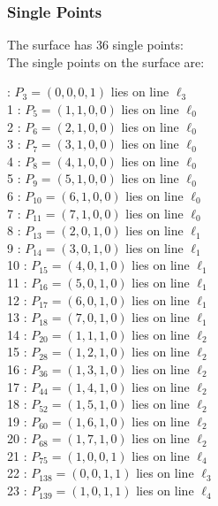 \documentclass{article}
\begin{document}
{\subsubsection*{Single Points}
The surface has 36 single points:\\
The single points on the surface are:\\
\begin{multicols}{2}
 : $P_{3}=( 0, 0, 0, 1 )$ lies on line $\ell_{3}$\\
1 : $P_{5}=( 1, 1, 0, 0 )$ lies on line $\ell_{0}$\\
2 : $P_{6}=( 2, 1, 0, 0 )$ lies on line $\ell_{0}$\\
3 : $P_{7}=( 3, 1, 0, 0 )$ lies on line $\ell_{0}$\\
4 : $P_{8}=( 4, 1, 0, 0 )$ lies on line $\ell_{0}$\\
5 : $P_{9}=( 5, 1, 0, 0 )$ lies on line $\ell_{0}$\\
6 : $P_{10}=( 6, 1, 0, 0 )$ lies on line $\ell_{0}$\\
7 : $P_{11}=( 7, 1, 0, 0 )$ lies on line $\ell_{0}$\\
8 : $P_{13}=( 2, 0, 1, 0 )$ lies on line $\ell_{1}$\\
9 : $P_{14}=( 3, 0, 1, 0 )$ lies on line $\ell_{1}$\\
10 : $P_{15}=( 4, 0, 1, 0 )$ lies on line $\ell_{1}$\\
11 : $P_{16}=( 5, 0, 1, 0 )$ lies on line $\ell_{1}$\\
12 : $P_{17}=( 6, 0, 1, 0 )$ lies on line $\ell_{1}$\\
13 : $P_{18}=( 7, 0, 1, 0 )$ lies on line $\ell_{1}$\\
14 : $P_{20}=( 1, 1, 1, 0 )$ lies on line $\ell_{2}$\\
15 : $P_{28}=( 1, 2, 1, 0 )$ lies on line $\ell_{2}$\\
16 : $P_{36}=( 1, 3, 1, 0 )$ lies on line $\ell_{2}$\\
17 : $P_{44}=( 1, 4, 1, 0 )$ lies on line $\ell_{2}$\\
18 : $P_{52}=( 1, 5, 1, 0 )$ lies on line $\ell_{2}$\\
19 : $P_{60}=( 1, 6, 1, 0 )$ lies on line $\ell_{2}$\\
20 : $P_{68}=( 1, 7, 1, 0 )$ lies on line $\ell_{2}$\\
21 : $P_{75}=( 1, 0, 0, 1 )$ lies on line $\ell_{4}$\\
22 : $P_{138}=( 0, 0, 1, 1 )$ lies on line $\ell_{3}$\\
23 : $P_{139}=( 1, 0, 1, 1 )$ lies on line $\ell_{4}$\\

\end{multicols}}
\end{document}

